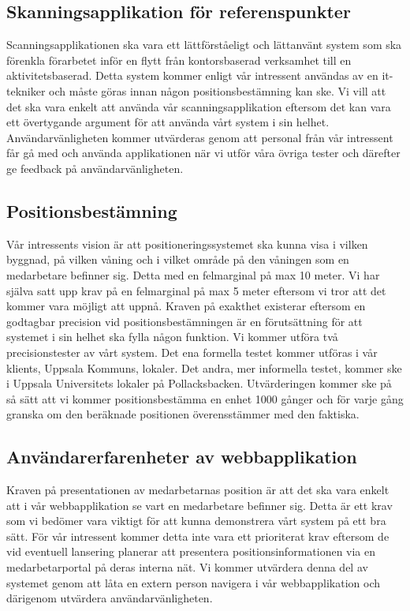 \documentclass[swedish, a4paper,12pt]{article}
\begin{document}
\subsection{Skanningsapplikation för referenspunkter}
Scanningsapplikationen ska vara ett lättförståeligt och lättanvänt system som ska förenkla förarbetet inför en flytt från kontorsbaserad verksamhet till en aktivitetsbaserad. Detta system kommer enligt vår intressent användas av en it-tekniker och måste göras innan någon positionsbestämning kan ske. Vi vill att det ska vara enkelt att använda vår scanningsapplikation eftersom det kan vara ett övertygande argument för att använda vårt system i sin helhet. Användarvänligheten kommer utvärderas genom att personal från vår intressent får gå med och använda applikationen när vi utför våra övriga tester och därefter ge feedback på användarvänligheten.

\subsection{Positionsbestämning}
Vår intressents vision är att positioneringssystemet ska kunna visa i vilken byggnad, på vilken våning och i vilket område på den våningen som en medarbetare befinner sig. Detta med en felmarginal på max 10 meter. Vi har själva satt upp krav på en felmarginal på max 5 meter eftersom vi tror att det kommer vara möjligt att uppnå. Kraven på exakthet existerar eftersom en godtagbar precision vid positionsbestämningen är en förutsättning för att systemet i sin helhet ska fylla någon funktion. Vi kommer utföra två precisionstester av vårt system. Det ena formella testet kommer utföras i vår klients, Uppsala Kommuns, lokaler. Det andra, mer informella testet, kommer ske i Uppsala Universitets lokaler på Pollacksbacken. Utvärderingen kommer ske på så sätt att vi kommer positionsbestämma en enhet 1000 gånger och för varje gång granska om den beräknade positionen överensstämmer med den faktiska.

\subsection{Användarerfarenheter av webbapplikation}
Kraven på presentationen av medarbetarnas position är att det ska vara enkelt att i vår webbapplikation se vart en medarbetare befinner sig. Detta är ett krav som vi bedömer vara viktigt för att kunna demonstrera vårt system på ett bra sätt. För vår intressent kommer detta inte vara ett prioriterat krav eftersom de vid eventuell lansering planerar att presentera positionsinformationen via en medarbetarportal på deras interna nät. Vi kommer utvärdera denna del av systemet genom att låta en extern person navigera i vår webbapplikation och därigenom utvärdera användarvänligheten.
\end{document}
